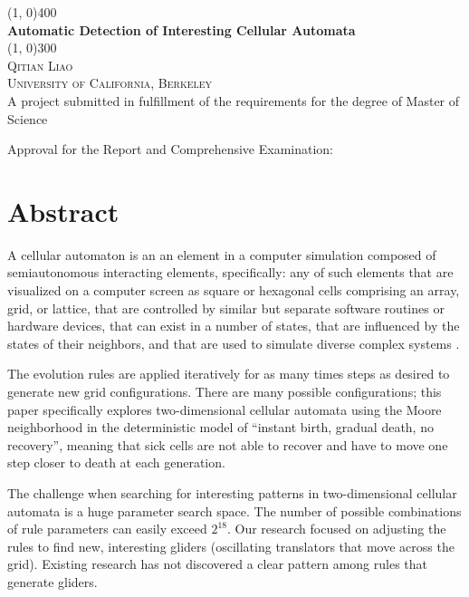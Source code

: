 \documentclass[12pt]{article}
\numberwithin{figure}{section} %
\begin{document}
\begin{titlepage}
\thispagestyle{empty}
	\begin{center} 
	\line(1, 0){400}\\
	[1mm]
	\Huge{\bfseries Automatic Detection of Interesting Cellular Automata} \\
	[1mm]
	\line(1, 0){300} \\
	[1.5cm]
	\textsc{\LARGE Qitian Liao} \\
	[0.5cm]
	\textsc{\large University of California, Berkeley} \\
	[5cm]
	\small{A project submitted in fulfillment of the requirements for the degree of Master of Science}

Approval for the Report and Comprehensive Examination:

	\end{center}
	\begin{flushright}	
	\end{flushright}
\end{titlepage}

\thispagestyle{plain}
\section*{\centering Abstract}

A cellular automaton is an an element in a computer simulation composed of semiautonomous interacting elements, specifically: any of such elements that are visualized on a computer screen as square or hexagonal cells comprising an array, grid, or lattice, that are controlled by similar but separate software routines or hardware devices, that can exist in a number of states, that are influenced by the states of their neighbors, and that are used to simulate diverse complex systems \cite{MW}. 

The evolution rules are applied iteratively for as many times steps as desired to generate new grid configurations. There are many possible configurations; this paper specifically explores two-dimensional cellular automata using the Moore neighborhood in the deterministic model of “instant birth, gradual death, no recovery”, meaning that sick cells are not able to recover and have to move one step closer to death at each generation. 

The challenge when searching for interesting patterns in two-dimensional cellular automata is a huge parameter search space. The number of possible combinations of rule parameters can easily exceed $2^18$. Our research focused on adjusting the rules to find new, interesting gliders (oscillating translators that move across the grid). Existing research has not discovered a clear pattern among rules that generate gliders. 
\end{document}
